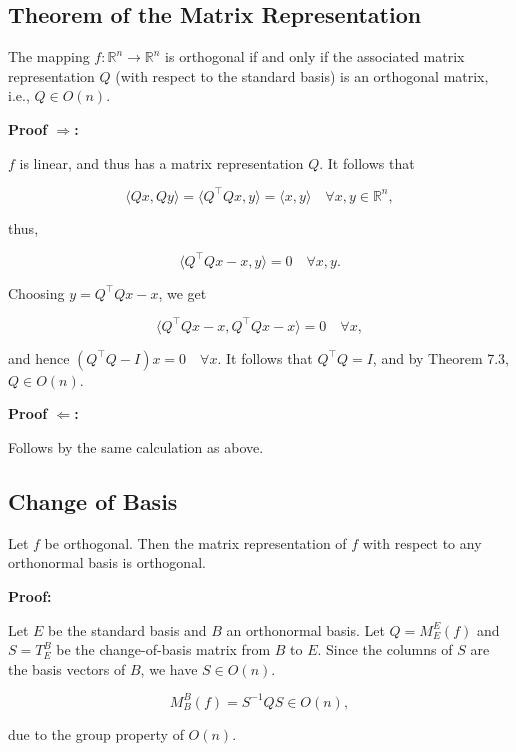 \QED

\subsection{Theorem of the Matrix Representation}

The mapping \( f : \mathbb{R}^n \to \mathbb{R}^n \) is orthogonal if and only if  
the associated matrix representation \( Q \) (with respect to the standard basis) is an orthogonal matrix, i.e., \( Q \in O(n) \).
\vspace{\baselineskip}

\textbf{Proof \(\Rightarrow\):} 

\( f \) is linear, and thus has a matrix representation \( Q \). It follows that

\[
\langle Qx, Qy \rangle = \langle Q^\top Qx, y \rangle = \langle x, y \rangle \quad \forall x, y \in \mathbb{R}^n,
\]

thus,

\[
\langle Q^\top Qx - x, y \rangle = 0 \quad \forall x, y.
\]

Choosing \( y = Q^\top Qx - x \), we get

\[
\langle Q^\top Qx - x, Q^\top Qx - x \rangle = 0 \quad \forall x,
\]

and hence \( (Q^\top Q - I)x = 0 \quad \forall x \).  
It follows that \( Q^\top Q = I \), and by Theorem 7.3, \( Q \in O(n) \).

\QED
\vspace{\baselineskip}

\textbf{Proof \(\Leftarrow\):} 

Follows by the same calculation as above.

\QED

\subsection{Change of Basis}

Let \( f \) be orthogonal. Then the matrix representation of \( f \)  
with respect to any orthonormal basis is orthogonal.
\vspace{\baselineskip}

\textbf{Proof:} 

Let \( E \) be the standard basis and \( B \) an orthonormal basis. Let  
\( Q = M_E^E(f) \) and \( S = T_E^B \) be the change-of-basis matrix from \( B \) to \( E \).  
Since the columns of \( S \) are the basis vectors of \( B \), we have \( S \in O(n) \).  

\[
M_B^B(f) = S^{-1} Q S \in O(n),
\]

due to the group property of \( O(n) \).

\QED

